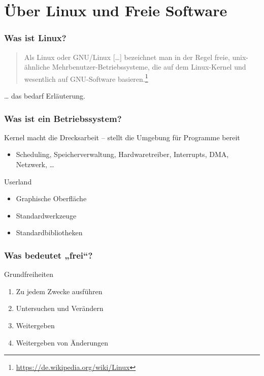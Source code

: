 \documentclass[t]{beamer}
\begin{document}
\section{Über Linux und Freie Software}
\begin{frame}
  \frametitle{Was ist Linux?}
  \begin{quote}
    Als Linux oder GNU/Linux […] bezeichnet man in
    der Regel freie, unix-ähnliche Mehrbenutzer-Betriebssysteme, die
    auf dem Linux-Kernel und wesentlich auf GNU-Software
    basieren.\footnote{\url{https://de.wikipedia.org/wiki/Linux}}
  \end{quote}
  \begin{center}
    \Large … das bedarf Erläuterung.
  \end{center}
\end{frame}

\begin{frame}
  \frametitle{Was ist ein Betriebssystem?}
  \begin{block}{Kernel}
    macht die Drecksarbeit – stellt die Umgebung für Programme bereit
    \begin{itemize}
    \item Scheduling, Speicherverwaltung, Hardwaretreiber, Interrupts,
      DMA, Netzwerk, …
    \end{itemize}
  \end{block}
  \begin{block}{Userland}
    \begin{itemize}
    \item Graphische Oberfläche
    \item Standardwerkzeuge
    \item Standardbibliotheken
    \end{itemize}
  \end{block}
\end{frame}

\begin{frame}
  \frametitle{Was bedeutet „frei“?}
  \begin{block}{Grundfreiheiten}
    \begin{enumerate}
    \item Zu jedem Zwecke ausführen
    \item Untersuchen und Verändern
    \item Weitergeben
    \item Weitergeben von Änderungen
    \end{enumerate}
  \end{block}
\end{frame}
\end{document}
